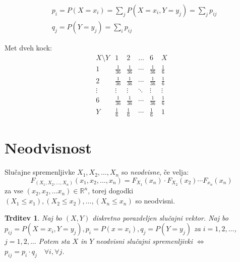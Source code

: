 \documentclass[12pt]{book}
\def\n{\noindent}
\theoremstyle{definition}
\theoremstyle{plain}
\theoremstyle{plain}
\newtheorem{trditev}{Trditev}
\theoremstyle{plain}
\theoremstyle{remark}
\begin{document}
$$
\begin{aligned}
    &p_i=P\left(X=x_i\right)=\sum_j P\left(X=x_i, Y=y_j \right)=\sum_j p_{ij} \\
    &q_j=P\left(Y=y_j\right)=\sum_i p_{ij}
\end{aligned}
$$

\begin{zgled}
    Met dveh kock: 
    $$
    \begin{array}{c|cccc|c}
        X \setminus Y & 1 & 2 & \ldots & 6 & X \\
        \hline 1 & \frac{1}{36} & \frac{1}{36} & \cdots & \frac{1}{36} & \frac{1}{6}\\
        2 & \frac{1}{36} & \frac{1}{36} & \cdots & \frac{1}{36} & \frac{1}{6}\\
        \vdots & \vdots & \vdots & \ddots & \vdots & \vdots \\
        6 & \frac{1}{36} & \frac{1}{36} & \cdots & \frac{1}{36} & \frac{1}{6} \\
        \hline Y & \frac{1}{6} & \frac{1}{6} & \cdots & \frac{1}{6} & 1
    \end{array}
    $$
\end{zgled}

\section{Neodvisnost}

\n Slučajne spremenljivke $X_1, X_2, \ldots, X_n$ so \emph{neodvisne}, če velja: 
$$
F_{\left(X_1, X_2, \ldots, X_n\right)}\left(x_1, x_2, \ldots, x_n\right)=F_{X_1}\left(x_n\right) \cdot F_{X_2}\left(x_2\right) \cdots F_{x_n}\left(x_n\right)
$$
za vse $\left(x_2, x_2, \ldots x_n\right) \in \mathbb{R}^n$, torej dogodki $\left(X_1 \leq x_1\right),\left(X_2 \leq x_2\right), \ldots,\left(X_n \leq x_n\right)$ so neodvisni.

\begin{trditev}
    Naj bo $(X,Y)$ diskretno porazdeljen slučajni vektor. Naj bo $p_{i j}=P\left(X=x_i, Y=y_j\right), p_i=P\left(x=x_i\right), q_j=P\left(Y=y_j\right)$ za $i=1, 2, \ldots$, $j=1, 2, \ldots$ Potem sta $X$ in $Y$ neodvisni slučajni spremenljivki $\iff$ $p_{i j}=p_i \cdot q_j \quad \forall i, \forall j$. 
\end{trditev}
\end{document}
